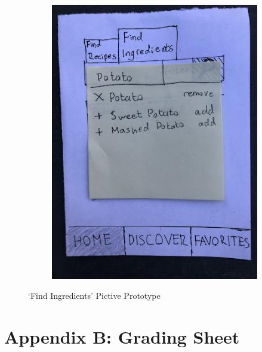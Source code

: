 \documentclass[11pt,english]{article}
\begin{document}
\begin{figure}[H]
\begin{subfigure}[b]{0.4\linewidth}
    \includegraphics[width=\linewidth]{figure9v1.png}
  \end{subfigure}
  \caption{`Find Ingredients' Pictive Prototype}
  \label{fig:figure8}
\end{figure}
\newpage
\newpage
\section{Appendix B: Grading Sheet}
\end{document}
